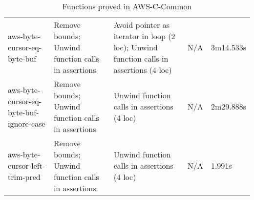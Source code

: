 \begin{table}
\begin{tabularx}{\textwidth}{XXXXX}
		aws-byte-cursor-eq-byte-buf             & Remove bounds; Unwind function calls in assertions                        & Avoid pointer as iterator in loop (2 loc); Unwind function calls in assertions (4 loc) & N/A                                                                   & 3m14.533s     \\
		aws-byte-cursor-eq-byte-buf-ignore-case & Remove bounds; Unwind function calls in assertions                        & Unwind function calls in assertions (4 loc)                                            & N/A                                                                   & 2m29.888s     \\
		aws-byte-cursor-left-trim-pred          & Remove bounds; Unwind function calls in assertions                        & Unwind function calls in assertions (4 loc)                                            & N/A                                                                   & 1.991s        \\
		\bottomrule
	\end{tabularx}
	\caption{Functions proved in AWS-C-Common}
	\label{tab:listofproofs}
\end{table}

